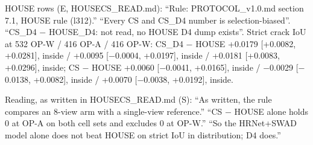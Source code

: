 \begin{longtable}
{HOUSE rows (E, HOUSECS\_\allowbreak{}READ.md): ``Rule: PROTOCOL\_\allowbreak{}v1.0.md section 7.1, HOUSE rule (l312).'' ``Every CS and CS\_\allowbreak{}D4 number is selection-biased''. ``CS\_\allowbreak{}D4 $-$ HOUSE\_\allowbreak{}D4: not read, no HOUSE D4 dump exists''. Strict crack IoU at 532 OP-W / 416 OP-A / 416 OP-W: CS\_\allowbreak{}D4 $-$ HOUSE +0.0179 [+0.0082, +0.0281], inside / +0.0095 [$-$0.0004, +0.0197], inside / +0.0181 [+0.0083, +0.0296], inside; CS $-$ HOUSE +0.0060 [$-$0.0041, +0.0165], inside / $-$0.0029 [$-$0.0138, +0.0082], inside / +0.0070 [$-$0.0038, +0.0192], inside.\par
Reading, as written in HOUSECS\_\allowbreak{}READ.md (S): ``As written, the rule compares an 8-view arm with a single-view reference.'' ``CS $-$ HOUSE alone holds 0 at OP-A on both cell sets and excludes 0 at OP-W.'' ``So the HRNet+SWAD model alone does not beat HOUSE on strict IoU in distribution; D4 does.''\par
}\\
\end{longtable}
\endgroup

